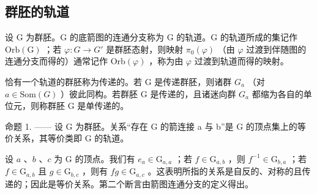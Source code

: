\subsection{群胚的轨道}

设 G 为群胚。G 的底箭图的连通分支称为 G 的轨道。G 的轨道所成的集记作 \(\mathrm{Orb}(\mathrm{G})\) ；若 \(\varphi: G \to G'\) 是群胚态射，则映射 \(\pi_{0}(\varphi)\) （由 \(\varphi\) 过渡到伴随图的连通分支而得的）通常记作 \(\mathrm{Orb}(\varphi)\) ，称为由 \(\varphi\) 过渡到轨道而得的映射。

恰有一个轨道的群胚称为传递的。若 G 是传递群胚，则诸群 \(G_{a}\) （对 \(a \in \text{Som}(G)\) ）彼此同构。若群胚 G 是传递的，且诸迷向群 \(G_{a}\) 都缩为各自的单位元，则称群胚 G 是单传递的。

命题 1. —— 设 G 为群胚。关系“存在 G 的箭连接 a 与 b”是 G 的顶点集上的等价关系，其等价类即 G 的轨道。

设 \(a\) 、\(b\) 、\(c\) 为 G 的顶点。我们有 \(e_a \in \mathrm{G}_{a,a}\) ；若 \(f \in \mathrm{G}_{a,b}\) ，则 \(f^{-1} \in \mathrm{G}_{b,a}\) ；若 \(f \in \mathrm{G}_{a,b}\) 且 \(g \in \mathrm{G}_{b,c}\) ，则有 \(fg \in \mathrm{G}_{a,c}\) 。这表明所指的关系是自反的、对称的且传递的；因此是等价关系。第二个断言由箭图连通分支的定义得出。


